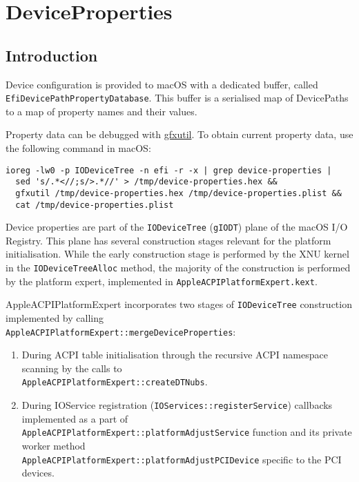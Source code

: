 \documentclass[]{article}
\providecommand{\tightlist}{%
  \setlength{\itemsep}{0pt}\setlength{\parskip}{0pt}}
\begin{document}
\section{DeviceProperties}\label{devprops}

\subsection{Introduction}\label{devpropsintro}

Device configuration is provided to macOS with a dedicated buffer,
called \texttt{EfiDevicePathPropertyDatabase}. This buffer is a serialised
map of DevicePaths to a map of property names and their values.

Property data can be debugged with
\href{https://github.com/acidanthera/gfxutil}{gfxutil}.
To obtain current property data, use the following command in macOS:
\begin{lstlisting}[label=gfxutil, style=ocbash]
ioreg -lw0 -p IODeviceTree -n efi -r -x | grep device-properties |
  sed 's/.*<//;s/>.*//' > /tmp/device-properties.hex &&
  gfxutil /tmp/device-properties.hex /tmp/device-properties.plist &&
  cat /tmp/device-properties.plist
\end{lstlisting}

Device properties are part of the \texttt{IODeviceTree} (\texttt{gIODT})
plane of the macOS I/O Registry. This plane has several construction stages
relevant for the platform initialisation. While the early construction
stage is performed by the XNU kernel in the \texttt{IODeviceTreeAlloc}
method, the majority of the construction is performed by the platform expert,
implemented in \texttt{AppleACPIPlatformExpert.kext}.

AppleACPIPlatformExpert incorporates two stages of \texttt{IODeviceTree}
construction implemented by calling \\
\texttt{AppleACPIPlatformExpert::mergeDeviceProperties}:

\begin{enumerate}
  \tightlist
  \item During ACPI table initialisation through the recursive ACPI namespace scanning
  by the calls to \\
  \texttt{AppleACPIPlatformExpert::createDTNubs}.
  \item During IOService registration (\texttt{IOServices::registerService}) callbacks
  implemented as a part of \\
  \texttt{AppleACPIPlatformExpert::platformAdjustService}
  function and its private worker method \\
  \texttt{AppleACPIPlatformExpert::platformAdjustPCIDevice}
  specific to the PCI devices.
\end{enumerate}
\end{document}
